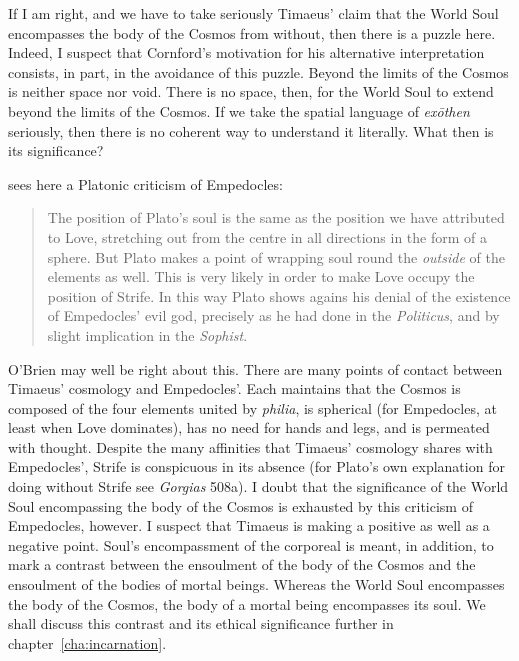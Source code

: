 If I am right, and we have to take seriously Timaeus' claim that the World Soul encompasses the body of the Cosmos from without, then there is a puzzle here. Indeed, I suspect that Cornford's motivation for his alternative interpretation consists, in part, in the avoidance of this puzzle. Beyond the limits of the Cosmos is neither space nor void. There is no space, then, for the World Soul to extend beyond the limits of the Cosmos. If we take the spatial language of \emph{exōthen} seriously, then there is no coherent way to understand it literally. What then is its significance? 

\citet[144--5]{OBrien:1969ty} sees here a Platonic criticism of Empedocles:
\begin{quote}
	The position of Plato's soul is the same as the position we have attributed to Love, stretching out from the centre in all directions in the form of a sphere. But Plato makes a point of wrapping soul round the \emph{outside} of the elements as well. This is very likely in order to make Love occupy the position of Strife. In this way Plato shows agains his denial of the existence of Empedocles' evil god, precisely as he had done in the \emph{Politicus}, and by slight implication in the \emph{Sophist}. \citep[145]{OBrien:1969ty}
\end{quote}
O'Brien may well be right about this. There are many points of contact between Timaeus' cosmology and Empedocles'. Each maintains that the Cosmos is composed of the four elements united by \emph{philia}, is spherical (for Empedocles, at least when Love dominates), has no need for hands and legs, and is permeated with thought. Despite the many affinities that Timaeus' cosmology shares with Empedocles', Strife is conspicuous in its absence (for Plato's own explanation for doing without Strife see \emph{Gorgias} 508a). I doubt that the significance of the World Soul encompassing the body of the Cosmos is exhausted by this criticism of Empedocles, however. I suspect that Timaeus is making a positive as well as a negative point. Soul's encompassment of the corporeal is meant, in addition, to mark a contrast between the ensoulment of the body of the Cosmos and the ensoulment of the bodies of mortal beings. Whereas the World Soul encompasses the body of the Cosmos, the body of a mortal being encompasses its soul. We shall discuss this contrast and its ethical significance further in chapter~\ref{cha:incarnation}.

